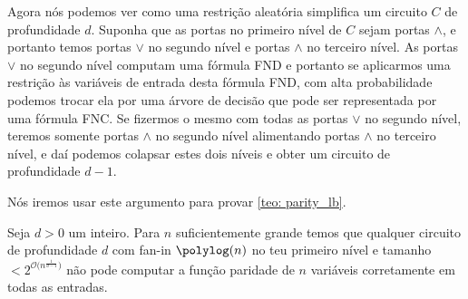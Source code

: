 Agora nós podemos ver como uma restrição aleatória simplifica um circuito $C$ de profundidade $d$. Suponha que as portas no primeiro nível de $C$ sejam portas $\land$, e portanto temos portas $\lor$ no segundo nível e portas $\land$ no terceiro nível. As portas $\lor$ no segundo nível computam uma fórmula FND e portanto se aplicarmos uma restrição às variáveis de entrada desta fórmula FND, com alta probabilidade podemos trocar ela por uma árvore de decisão que pode ser representada por uma fórmula FNC. Se fizermos o mesmo com todas as portas $\lor$ no segundo nível, teremos somente portas $\land$ no segundo nível alimentando portas $\land$ no terceiro nível, e daí podemos colapsar estes dois níveis e obter um circuito de profundidade $d - 1$.

Nós iremos usar este argumento para provar \ref{teo: parity_lb}.

\begin{teo} \label{parity_lb_2}

Seja $d > 0$ um inteiro. Para $n$ suficientemente grande temos que qualquer circuito de profundidade $d$ com fan-in $\polylog(n)$ no teu primeiro nível e tamanho $< 2^{\mathcal{O}\big(n^{\frac{1}{d - 1}}\big)}$ não pode computar a função paridade de $n$ variáveis corretamente em todas as entradas. 

\end{teo}

